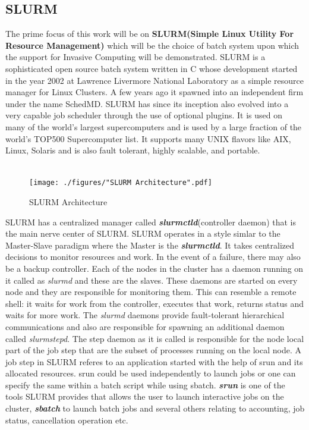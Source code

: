 \subsection{SLURM}
The prime focus of this work will be on \textbf{SLURM(Simple Linux Utility For Resource Management)} which will be the choice of batch system upon which the support for Invasive Computing will be demonstrated. SLURM is a sophisticated open source batch system written in C whose development started in the year 2002 at Lawrence Livermore National Laboratory as a simple resource manager for Linux Clusters. A few years ago it spawned into an independent firm under the name SchedMD. SLURM has since its inception also evolved into a very capable job scheduler through the use of optional plugins. It is used on many of the world's largest supercomputers and is used by a large fraction of the world's TOP500 Supercomputer list. It supports many UNIX flavors like AIX, Linux, Solaris and is also fault tolerant, highly scalable, and portable.\\ \\
\begin{figure}[!ht]
\centering
\texttt{[image: ./figures/"SLURM Architecture".pdf]}
\caption{SLURM Architecture}
\label{fig:6}
\end{figure}
\noindent
SLURM has a centralized manager called \textbf{\textit{slurmctld}}(controller daemon) that is the main nerve center of SLURM. SLURM operates in a style simlar to the Master-Slave paradigm where the Master is the \textbf{\textit{slurmctld}}. It takes centralized decisions to monitor resources and work. In the event of a failure, there may also be a backup controller. Each of the nodes in the cluster has a daemon running on it called as \textit{slurmd} and these are the slaves. These daemons are started on every node and they are responsible for monitoring them. This can resemble a remote shell: it waits for work from the controller, executes that work, returns status and waits for more work. The \textit{slurmd} daemons provide fault-tolerant hierarchical communications and also are responsible for spawning an additional daemon called \textit{slurmstepd}. The step daemon as it is called is responsible for the node local part of the job step that are the subset of processes running on the local node. A job step in SLURM referes to an application started with the help of srun and its allocated resources. srun could be used independently to launch jobs or one can specify the same within a batch script while using sbatch. \textbf{\textit{srun}} is one of the tools SLURM provides that allows the user to launch interactive jobs on the cluster, \textbf{\textit{sbatch}} to launch batch jobs and several others relating to accounting, job status, cancellation operation etc.\\ \\
